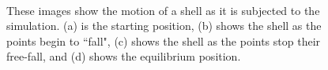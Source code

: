 \documentclass{thesis}
\begin{document}
\begin{figure}
\centering
{}
\\
\caption[Simulation frames]{These images show the motion of a shell as it is subjected to the simulation.  (a) is the starting position,
(b) shows the shell as the points begin to ``fall", (c) shows the shell as the points stop their free-fall, and (d) shows the equilibrium
position.}
\label{fig:wireframe_sim}
\end{figure}
\end{document}
